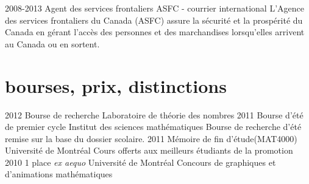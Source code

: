 \documentclass{cv-friggeri}  %
\begin{document}
\begin{entrylist}
\entryetc
{2008-2013} %
{Agent des services frontaliers}{}
{ASFC - courrier international} %
{L'Agence des services frontaliers du Canada (ASFC) assure la sécurité et la prospérité du Canada en gérant l'accès des personnes et des marchandises lorsqu'elles arrivent au Canada ou en sortent.
}
\end{entrylist}


\section{bourses, prix, distinctions}
\begin{entrylist}
\entry
{2012}
{Bourse de recherche}{}
{Laboratoire de théorie des nombres}
\entryetc
{2011}
{Bourse d’été de premier cycle}{}
{Institut des sciences mathématiques}
{Bourse de recherche d'été remise sur la base du dossier scolaire.}
\entryetc
{2011}
{Mémoire de fin d'étude}{(MAT4000)}
{Université de Montréal}
{Cours offerts aux meilleurs étudiants de la promotion}
\entryetc
{2010}
{1\iere{} place \emph{ex aequo}}{}
{Université de Montréal}
{Concours de graphiques et d’animations mathématiques}
\end{entrylist}
\end{document}
